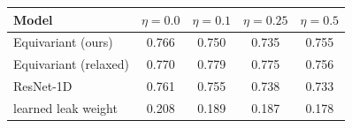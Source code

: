 \begin{tabular}{lcccc}
\toprule
Model & $\eta=0.0$ & $\eta=0.1$ & $\eta=0.25$ & $\eta=0.5$ \\
\midrule
  Equivariant (ours) & 0.766 & 0.750 & 0.735 & 0.755 \\
  Equivariant (relaxed) & 0.770 & 0.779 & 0.775 & 0.756 \\
  ResNet-1D & 0.761 & 0.755 & 0.738 & 0.733 \\
\midrule
  learned leak weight & 0.208 & 0.189 & 0.187 & 0.178 \\
\bottomrule
\end{tabular}